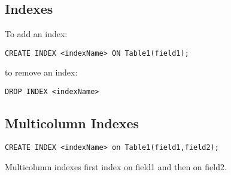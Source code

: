 \documentclass{sciposter}
\renewcommand{\t}[1]{\texttt{#1}}
\begin{document}
\begin{multicols}{3}
\section*{Indexes}

To add an index:

\t{CREATE INDEX <indexName> ON Table1(field1);}

to remove an index:

\t{DROP INDEX <indexName>}

\subsection*{Multicolumn Indexes}

\t{CREATE INDEX <indexName> on Table1(field1,field2);}

Multicolumn indexes first index on field1 and then on field2.

\newpage




\end{multicols}
\end{document}
